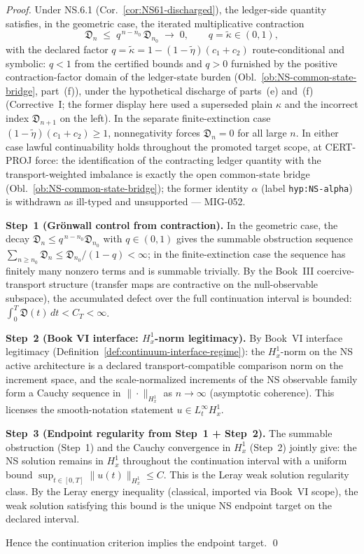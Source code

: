 \documentclass[12pt,oneside]{amsbook}
\theoremstyle{plain}
\theoremstyle{definition}
\theoremstyle{remark}
\begin{document}
\begin{proof}
Under NS.6.1 (Cor.~\ref{cor:NS61-discharged}), the ledger-side
quantity satisfies, in the geometric case, the iterated
multiplicative contraction
\[
 \mathfrak{D}_{n} \;\leq\; q^{\,n-n_0}\,\mathfrak{D}_{n_0}
 \;\longrightarrow\; 0,
 \qquad
 q = \widetilde\kappa \in (0,1),
\]
with the declared factor $q = \widetilde\kappa =
1-(1-\widetilde\eta)(c_1+c_2)$ route-conditional and symbolic:
$q < 1$ from the certified bounds and $q > 0$ furnished by the
positive contraction-factor domain of the ledger-state burden
(Obl.~\ref{ob:NS-common-state-bridge}, part~(f)), under the
hypothetical discharge of parts~(e) and~(f) (Corrective~I; the
former display here used a superseded plain $\kappa$ and the
incorrect index $\mathfrak{D}_{n+1}$ on the left). In the separate
finite-extinction case $(1-\widetilde\eta)(c_1+c_2) \geq 1$,
nonnegativity forces $\mathfrak{D}_n = 0$ for all large $n$. In
either case lawful continuability holds throughout the promoted
target scope, at CERT-PROJ force: the identification of the
contracting ledger quantity with the transport-weighted imbalance
is exactly the open common-state bridge
(Obl.~\ref{ob:NS-common-state-bridge}); the former identity
$\alpha$ (label \texttt{hyp:NS-alpha}) is withdrawn as ill-typed
and unsupported --- MIG-052.

\textbf{Step~1 (Grönwall control from contraction).}
In the geometric case, the decay
$\mathfrak{D}_n \leq q^{\,n-n_0}\mathfrak{D}_{n_0}$ with
$q \in (0,1)$ gives the summable obstruction sequence
$\sum_{n \geq n_0} \mathfrak{D}_n \leq
\mathfrak{D}_{n_0}/(1-q) < \infty$; in the finite-extinction
case the sequence has finitely many nonzero terms and is summable
trivially.
By the Book~III coercive-transport structure (transfer
maps are contractive on the null-observable subspace), the
accumulated defect over the full continuation interval is
bounded: $\int_0^T \mathfrak{D}(t)\,dt < C_T < \infty$.

\textbf{Step~2 (Book VI interface: $H^1_x$-norm legitimacy).}
By Book~VI interface legitimacy
(Definition~\ref{def:continuum-interface-regime}): the
$H^1_x$-norm on the NS active architecture is a declared
transport-compatible comparison norm on the increment space,
and the scale-normalized increments of the NS observable family
form a Cauchy sequence in $\|\cdot\|_{H^1_x}$ as $n \to \infty$
(asymptotic coherence). This licenses the smooth-notation
statement $u \in L^\infty_t H^1_x$.

\textbf{Step~3 (Endpoint regularity from Step~1 + Step~2).}
The summable obstruction (Step~1) and the Cauchy convergence
in $H^1_x$ (Step~2) jointly give: the NS solution remains in
$H^1_x$ throughout the continuation interval with a uniform
bound $\sup_{t \in [0,T]} \|u(t)\|_{H^1_x} \leq C$. This is
the Leray weak solution regularity class. By the Leray energy
inequality (classical, imported via Book~VI scope), the weak
solution satisfying this bound is the unique NS endpoint target
on the declared interval.

Hence the continuation criterion implies the endpoint target. \qed
\end{proof}
\end{document}
